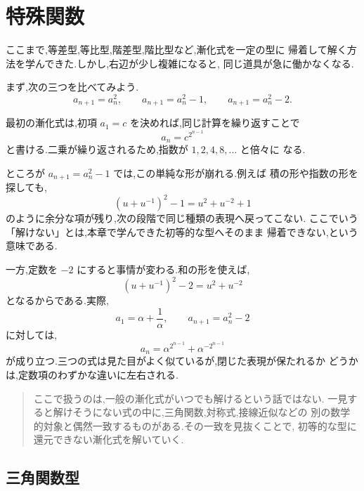 
\section{特殊関数}

ここまで,等差型,等比型,階差型,階比型など,漸化式を一定の型に
帰着して解く方法を学んできた.しかし,右辺が少し複雑になると,
同じ道具が急に働かなくなる.

まず,次の三つを比べてみよう.
\[
  a_{n+1}=a_n^2,
  \qquad
  a_{n+1}=a_n^2-1,
  \qquad
  a_{n+1}=a_n^2-2.
  \tag{2.7.1}
\]

最初の漸化式は,初項 $a_1=c$ を決めれば,同じ計算を繰り返すことで
\[
  a_n=c^{2^{n-1}}
\]
と書ける.二乗が繰り返されるため,指数が $1,2,4,8,\ldots$ と倍々に
なる.

ところが $a_{n+1}=a_n^2-1$ では,この単純な形が崩れる.例えば
積の形や指数の形を探しても,
\[
  (u+u^{-1})^2-1=u^2+u^{-2}+1
\]
のように余分な項が残り,次の段階で同じ種類の表現へ戻ってこない.
ここでいう「解けない」とは,本章で学んできた初等的な型へそのまま
帰着できない,という意味である.

一方,定数を $-2$ にすると事情が変わる.和の形を使えば,
\[
  \left(u+u^{-1}\right)^2-2=u^2+u^{-2}
  \tag{2.7.2}
\]
となるからである.実際,
\[
  a_1=\alpha+\frac{1}{\alpha},
  \qquad
  a_{n+1}=a_n^2-2
\]
に対しては,
\[
  a_n=\alpha^{2^{n-1}}+\alpha^{-2^{n-1}}
\]
が成り立つ.三つの式は見た目がよく似ているが,閉じた表現が保たれるか
どうかは,定数項のわずかな違いに左右される.

\begin{quote}
ここで扱うのは,一般の漸化式がいつでも解けるという話ではない.
一見すると解けそうにない式の中に,三角関数,対称式,接線近似などの
別の数学的対象と偶然一致するものがある.その一致を見抜くことで,
初等的な型に還元できない漸化式を解いていく.
\end{quote}

\subsection{三角関数型}

